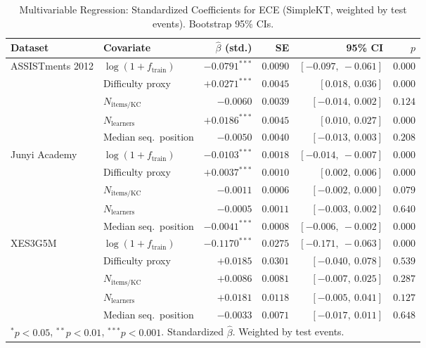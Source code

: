 \begin{table}[htbp]
\caption{Multivariable Regression: Standardized Coefficients for ECE (SimpleKT, weighted by test events). Bootstrap 95\% CIs.}
\label{tab:a4_regression}
\centering\small
\begin{tabular}{llrrrr}
\toprule
Dataset & Covariate & $\hat\beta$ (std.) & SE & 95\% CI & $p$ \\
\midrule
ASSISTments 2012 & $\log(1+f_{\text{train}})$ & $-0.0791^{***}$ & $0.0090$ & $[-0.097,\ -0.061]$ & $0.000$ \\
 & Difficulty proxy & $+0.0271^{***}$ & $0.0045$ & $[0.018,\ 0.036]$ & $0.000$ \\
 & $N_{\text{items/KC}}$ & $-0.0060$ & $0.0039$ & $[-0.014,\ 0.002]$ & $0.124$ \\
 & $N_{\text{learners}}$ & $+0.0186^{***}$ & $0.0045$ & $[0.010,\ 0.027]$ & $0.000$ \\
 & Median seq.\ position & $-0.0050$ & $0.0040$ & $[-0.013,\ 0.003]$ & $0.208$ \\
\midrule
Junyi Academy & $\log(1+f_{\text{train}})$ & $-0.0103^{***}$ & $0.0018$ & $[-0.014,\ -0.007]$ & $0.000$ \\
 & Difficulty proxy & $+0.0037^{***}$ & $0.0010$ & $[0.002,\ 0.006]$ & $0.000$ \\
 & $N_{\text{items/KC}}$ & $-0.0011$ & $0.0006$ & $[-0.002,\ 0.000]$ & $0.079$ \\
 & $N_{\text{learners}}$ & $-0.0005$ & $0.0011$ & $[-0.003,\ 0.002]$ & $0.640$ \\
 & Median seq.\ position & $-0.0041^{***}$ & $0.0008$ & $[-0.006,\ -0.002]$ & $0.000$ \\
\midrule
XES3G5M & $\log(1+f_{\text{train}})$ & $-0.1170^{***}$ & $0.0275$ & $[-0.171,\ -0.063]$ & $0.000$ \\
 & Difficulty proxy & $+0.0185$ & $0.0301$ & $[-0.040,\ 0.078]$ & $0.539$ \\
 & $N_{\text{items/KC}}$ & $+0.0086$ & $0.0081$ & $[-0.007,\ 0.025]$ & $0.287$ \\
 & $N_{\text{learners}}$ & $+0.0181$ & $0.0118$ & $[-0.005,\ 0.041]$ & $0.127$ \\
 & Median seq.\ position & $-0.0033$ & $0.0071$ & $[-0.017,\ 0.011]$ & $0.648$ \\
\midrule
\bottomrule
\multicolumn{6}{l}{\scriptsize ${}^{*}p<0.05$, ${}^{**}p<0.01$, ${}^{***}p<0.001$. Standardized $\hat\beta$. Weighted by test events.} \\
\end{tabular}
\end{table}